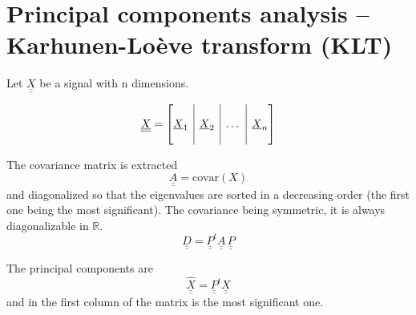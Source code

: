 \documentclass[11pt,oneside,a4paper]{memoir}
\author{\theauthor}
\title{\thetitle}
\renewcommand{\vec}[1]{\underline{#1}}
\newcommand{\mat}[1]{\underline{\underline{#1}}}
\begin{document}
\frontmatter
\clearpage
\thispagestyle{empty}
\maketitle
\vfill
\begin{abstract}
       ......
\end{abstract}
\vfill

\cleardoublepage

\tableofcontents*
\listoffigures*

\mainmatter




\renewcommand\cftappendixname{\appendixname~}



\appendix
\appendixpage
\chapter{Principal components analysis -- Karhunen-Loève transform (KLT)}
\label{apx:KLT}

Let $\mat{X}$ be a signal with n dimensions.

\begin{equation}
\mat{X} = \left[
\begin{array}{@{}c|c|c|c@{}}
&&&\\ \vec{X}_1 & \vec{X}_2 & \dots & \vec{X}_n \\ &&&
\end{array}
\right]
\end{equation} 

The covariance matrix is extracted
\begin{equation}
\mat{A} = \text{covar}(X) 
\end{equation}
and diagonalized so that the eigenvalues are sorted in a decreasing order (the first one being the most significant). The covariance being symmetric, it is always diagonalizable in $\mathbb{R}$.
\begin{equation}
\mat{D} = \mat{P}^{t} \mat{A} \, \mat{P} 
\end{equation}

The principal components are 
\begin{equation}
\hat{\mat{X}} = \mat{P}^{t} \mat{X}
\end{equation}
and in the first column of the matrix is the most significant one.
\end{document}
